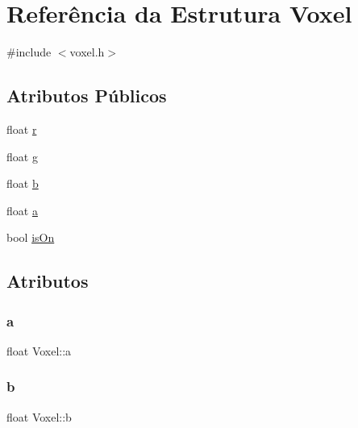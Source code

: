 \hypertarget{struct_voxel}{}\section{Referência da Estrutura Voxel}
\label{struct_voxel}


{\ttfamily \#include $<$voxel.\+h$>$}

\subsection*{Atributos Públicos}
\begin{DoxyCompactItemize}
\item 
float \mbox{\hyperlink{struct_voxel_a06872ec79b836120b551a848968c0f1b}{r}}
\item 
float \mbox{\hyperlink{struct_voxel_a27c0da1ed2ff430401d23ff171612a73}{g}}
\item 
float \mbox{\hyperlink{struct_voxel_a5cd8432b1d7d0fd8b79e0fc7d10373a8}{b}}
\item 
float \mbox{\hyperlink{struct_voxel_a3ce2579eb0a9f09a07112ce7498a638e}{a}}
\item 
bool \mbox{\hyperlink{struct_voxel_a6fbe8bd53f64685ac4210726d40fc775}{is\+On}}
\end{DoxyCompactItemize}


\subsection{Atributos}
\mbox{\label{struct_voxel_a3ce2579eb0a9f09a07112ce7498a638e}} 
\subsubsection{\texorpdfstring{a}{a}}
{\footnotesize\ttfamily float Voxel\+::a}

\mbox{\label{struct_voxel_a5cd8432b1d7d0fd8b79e0fc7d10373a8}} 
\subsubsection{\texorpdfstring{b}{b}}
{\footnotesize\ttfamily float Voxel\+::b}

\mbox{\label{struct_voxel_a27c0da1ed2ff430401d23ff171612a73}} 
